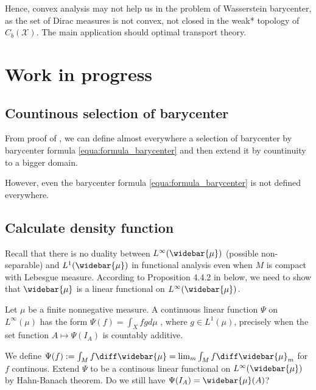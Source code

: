 \begin{rmk}
\begin{itemize}
	\end{itemize}
\end{rmk}

Hence, convex analysis may not help us in the problem of Wasserstein barycenter, as the set of Dirac measures is not convex, not closed in the weak* topology of $C_b(\mathcal{X})$. The main application should optimal transport theory.

\section{Work in progress}

\subsection{Countinous selection of barycenter}

From proof of ,
we can define almost everywhere a
selection of barycenter by barycenter formula \cref{equa:formula_barycenter}
and then extend it by countinuity to a bigger domain.

However,
even the barycenter formula \cref{equa:formula_barycenter} is not defined everywhere.

\subsection{Calculate density function}

Recall that there is no duality between $L^{\infty}(\widebar{\mu})$ (possible non-separable) and $L^1 (\widebar{\mu})$
in functional analysis even when $M$ is compact with Lebesgue measure.
According to Proposition 4.4.2 in \cite{Bogachev2007} below, we need to show that $\widebar{\mu}$ is a linear functional on $L^{\infty}(\widebar{\mu})$.
\begin{prop}
	Let \( \mu \) be a finite nonnegative measure.
	A continuous linear function \( \Psi \) on \( L ^ { \infty } ( \mu ) \) has the form
	\( \Psi ( f ) = \int _ { X } f g d \mu \)
	, where \( g \in L ^ { 1 } ( \mu ) \),
	precisely when the set function \( A \mapsto \Psi \left( I _ { A } \right) \) is countably additive.
\end{prop}
We define $\Psi(f):= \int_M f \diff \widebar{\mu} = \lim_m \int_M f \diff \widebar{\mu}_m$ for $f$ continous.
Extend $\Psi$ to be a continous linear functional on $L^{\infty}(\widebar{\mu})$ by Hahn-Banach theorem.
Do we still have $\Psi(I_A) = \widebar{\mu}(A)$?


